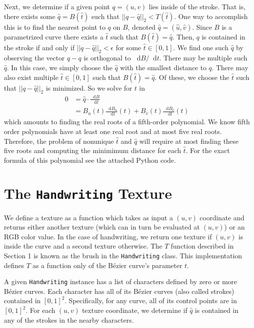 \documentclass[12pt]{article}
\newcommand*\diff{\mathop{}\!\mathrm{d}}
\begin{document}
Next, we determine if a given point $q = (u,v)$ lies inside of the stroke. That is, there exists some $\hat{q} = B(\hat{t})$ such that $||q - \hat{q}||_2 < T(\hat{t})$. One way to accomplish this is to find the nearest point to $q$ on $B$, denoted $\hat{q} = (\hat{u}, \hat{v})$. Since $B$ is a parametrized curve there exists a $\hat{t}$ such that $B(\hat{t}) = \hat{q}$. Then, $q$ is contained in the stroke if and only if $||q - \hat{q}||_2 < \epsilon$ for some $\hat{t} \in [0,1]$. We find one such $\hat{q}$ by observing the vector $\hat{q} - q$ is orthogonal to $\diff B / \diff t$. There may be multiple such $\hat{q}$. In this case, we simply choose the $\hat{q}$ with the smallest distance to $q$. There may also exist multiple $\hat{t} \in [0,1]$ such that $B(\hat{t}) = \hat{q}$. Of these, we choose the $\hat{t}$ such that $||q - \hat{q}||_2$ is minimized. So we solve for $t$ in
\begin{align}
 0 &= \hat{q} \cdot \frac{\diff B}{\diff t} \nonumber \\
  &= B_u(t)\frac{\diff B_u}{\diff t}(t) + B_v(t)\frac{\diff B_v}{\diff t}(t) \label{poly}
\end{align}
which amounts to finding the real roots of a fifth-order polynomial. We know fifth order polynomials have at least one real root and at most five real roots. Therefore, the problem of nonunique $\hat{t}$ and $\hat{q}$ will require at most finding these five roots and computing the minimimum distance for each $\hat{t}$. For the exact formula of this polynomial see the attached Python code.

\section{The \texttt{Handwriting} Texture}
We define a texture as a function which takes as input a $(u,v)$ coordinate and returns either another texture (which can in turn be evaluated at $(u,v)$) or an RGB color value. In the case of handwriting, we return one texture if $(u,v)$ is inside the curve and a second texture otherwise. The $T$ function described in Section 1 is known as the brush in the \texttt{Handwriting} class. This implementation defines $T$ as a function only of the B\'ezier curve's parameter $t$.

A given \texttt{Handwriting} instance has a list of characters defined by zero or more B\'ezier curves. Each character has all of its B\'ezier curves (also called strokes) contained in $[0,1]^2$. Specifically, for any curve, all of its control points are in $[0,1]^2$. For each $(u,v)$ texture coordinate, we determine if $\hat{q}$ is contained in any of the strokes in the nearby characters.
\end{document}
